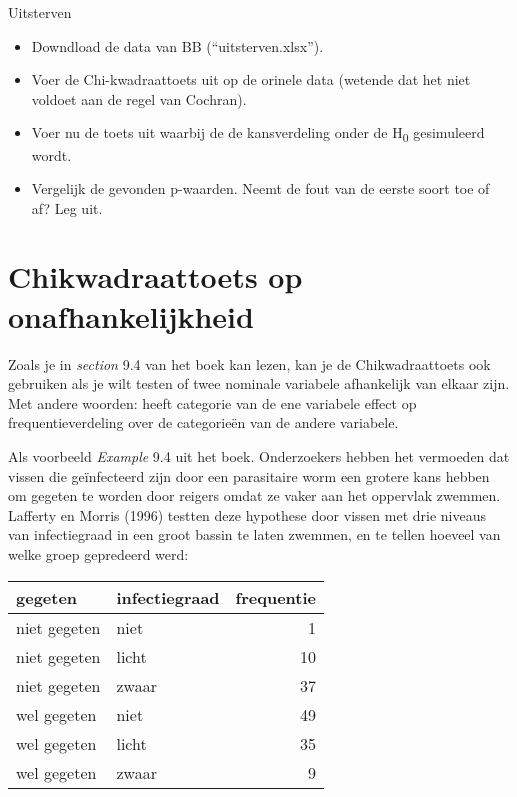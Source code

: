 \documentclass[]{book}
\providecommand{\tightlist}{%
  \setlength{\itemsep}{0pt}\setlength{\parskip}{0pt}}
\theoremstyle{definition}
\theoremstyle{definition}
\theoremstyle{definition}
\theoremstyle{remark}
\let\BeginKnitrBlock\begin \let\EndKnitrBlock\end
\begin{document}
\BeginKnitrBlock{exercise}
\protect\hypertarget{exr:extinction}{}{\label{exr:extinction} }Uitsterven

\begin{itemize}
\tightlist
\item
  Downdload de data van BB (``uitsterven.xlsx'').
\item
  Voer de Chi-kwadraattoets uit op de orinele data (wetende dat het niet
  voldoet aan de regel van Cochran).
\item
  Voer nu de toets uit waarbij de de kansverdeling onder de
  H\textsubscript{0} gesimuleerd wordt.
\item
  Vergelijk de gevonden p-waarden. Neemt de fout van de eerste soort toe
  of af? Leg uit.
\end{itemize}
\EndKnitrBlock{exercise}

\section{Chikwadraattoets op
onafhankelijkheid}\label{chikwadraattoets-op-onafhankelijkheid}

Zoals je in \emph{section} 9.4 van het boek kan lezen, kan je de
Chikwadraattoets ook gebruiken als je wilt testen of twee nominale
variabele afhankelijk van elkaar zijn. Met andere woorden: heeft
categorie van de ene variabele effect op frequentieverdeling over de
categorieën van de andere variabele.

Als voorbeeld \emph{Example} 9.4 uit het boek. Onderzoekers hebben het
vermoeden dat vissen die geïnfecteerd zijn door een parasitaire worm een
grotere kans hebben om gegeten te worden door reigers omdat ze vaker aan
het oppervlak zwemmen. Lafferty en Morris (1996) testten deze hypothese
door vissen met drie niveaus van infectiegraad in een groot bassin te
laten zwemmen, en te tellen hoeveel van welke groep gepredeerd werd:

\begin{tabular}{l|l|r}
\hline
gegeten & infectiegraad & frequentie\\
\hline
niet gegeten & niet & 1\\
\hline
niet gegeten & licht & 10\\
\hline
niet gegeten & zwaar & 37\\
\hline
wel gegeten & niet & 49\\
\hline
wel gegeten & licht & 35\\
\hline
wel gegeten & zwaar & 9\\
\hline
\end{tabular}
\end{document}
